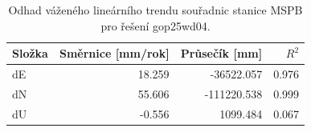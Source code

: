 \begin{table}[htbp]
\caption{Odhad váženého lineárního trendu souřadnic stanice MSPB pro řešení gop25wd04.}
\label{tab:gop25wd04_stcd_mspb_weighted_1seg}
\begin{tabular}{lrrr}
\toprule
Složka & Směrnice [mm/rok] & Průsečík [mm] & $R^2$ \\
\midrule
dE & 18.259 & -36522.057 & 0.976 \\
dN & 55.606 & -111220.538 & 0.999 \\
dU & -0.556 & 1099.484 & 0.067 \\
\bottomrule
\end{tabular}
\end{table}
